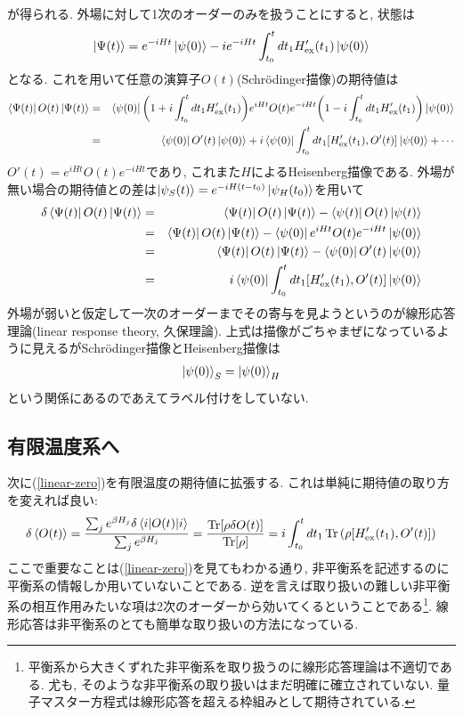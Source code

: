 \documentclass[10.5pt,a4paper]{jreport}
\begin{document}
が得られる. 外場に対して1次のオーダーのみを扱うことにすると, 状態は
\begin{eqnarray}
  \ket{\Psi(t)} = e^{-iHt}\ket{\psi(0)} -ie^{-iHt}\int_{t_0}^{t}dt_1H'_{\rm ex}(t_1)\ket{\psi(0)}
\end{eqnarray}
となる. これを用いて任意の演算子$O(t)$(Schr\"odinger描像)の期待値は
\begin{eqnarray}
  \bra{\Psi(t)}O(t)\ket{\Psi(t)} &=& \bra{\psi(0)}\qty(1 + i\int_{t_0}^{t}dt_1H'_{\rm ex}(t_1))e^{iHt}O(t)e^{-iHt}\qty(1 - i\int_{t_0}^{t}dt_1H'_{\rm ex}(t_1))\ket{\psi(0)}\\
  &=& \bra{\psi(0)}O'(t)\ket{\psi(0)} + i\bra{\psi(0)}\int_{t_0}^{t}dt_1\qty[H'_{\rm ex}(t_1), O'(t)]\ket{\psi(0)} + \cdots
\end{eqnarray}
$O'(t) = e^{iHt}O(t)e^{-iHt}$であり, これまた$H$によるHeisenberg描像である. 外場が無い場合の期待値との差は$\ket{\psi_S(t)} = e^{-iH(t-t_0)}\ket{\psi_H(t_0)}$を用いて
\begin{eqnarray}
\nonumber  \delta\bra{\Psi(t)}O(t)\ket{\Psi(t)} &=& \bra{\Psi(t)}O(t)\ket{\Psi(t)} - \bra{\psi(t)}O(t)\ket{\psi(t)}\\
\nonumber  &=& \bra{\Psi(t)}O(t)\ket{\Psi(t)} - \bra{\psi(0)}e^{iHt}O(t)e^{-iHt}\ket{\psi(0)}\\
\nonumber  &=& \bra{\Psi(t)}O(t)\ket{\Psi(t)} - \bra{\psi(0)}O'(t)\ket{\psi(0)}\\
  &=& i\bra{\psi(0)}\int_{t_0}^{t}dt_1\qty[H'_{\rm ex}(t_1), O'(t)]\ket{\psi(0)}\label{linear-zero}
\end{eqnarray}
外場が弱いと仮定して一次のオーダーまでその寄与を見ようというのが線形応答理論(linear response theory, 久保理論). 上式は描像がごちゃまぜになっているように見えるがSchr\"odinger描像とHeisenberg描像は
\begin{eqnarray}
  \ket{\psi(0)}_S = \ket{\psi(0)}_H
\end{eqnarray}
という関係にあるのであえてラベル付けをしていない.
\subsection{有限温度系へ}
次に(\ref{linear-zero})を有限温度の期待値に拡張する. これは単純に期待値の取り方を変えれば良い:
\begin{eqnarray}
  \delta\ev{O(t)} = \frac{\sum_j e^{\beta H_j}\delta\ev{O(t)}{i}}{\sum_j e^{\beta H_j}} = \frac{\Tr[\rho \delta O(t)]}{\Tr[\rho]} = i\int_{t_0}^{t}dt_1 \Tr\qty(\rho [H'_{\rm ex}(t_1), O'(t)])
\end{eqnarray}
ここで重要なことは(\ref{linear-zero})を見てもわかる通り, 非平衡系を記述するのに平衡系の情報しか用いていないことである. 逆を言えば取り扱いの難しい非平衡系の相互作用みたいな項は2次のオーダーから効いてくるということである\footnote{平衡系から大きくずれた非平衡系を取り扱うのに線形応答理論は不適切である. 尤も, そのような非平衡系の取り扱いはまだ明確に確立されていない. 量子マスター方程式は線形応答を超える枠組みとして期待されている.}. 線形応答は非平衡系のとても簡単な取り扱いの方法になっている.
\end{document}
